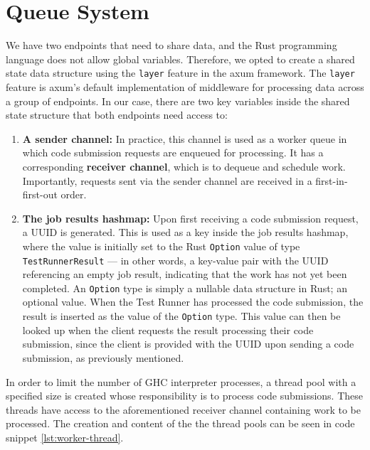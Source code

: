 \section{Queue System} \label{sec:queue-system}
We have two endpoints that need to share data, and the Rust programming language does not allow global variables.
Therefore, we opted to create a shared state data structure using the \texttt{layer} feature in the axum framework.
The \texttt{layer} feature is axum's default implementation of middleware for processing data across a group of endpoints.
In our case, there are two key variables inside the shared state structure that both endpoints need access to:
\begin{enumerate}
    \item \textbf{A sender channel:} In practice, this channel is used as a worker queue in which code submission requests are enqueued for processing. It has a corresponding \textbf{receiver channel}, which is to dequeue and schedule work. Importantly, requests sent via the sender channel are received in a first-in-first-out order.
    \item \textbf{The job results hashmap:} Upon first receiving a code submission request, a UUID is generated. This is used as a key inside the job results hashmap, where the value is initially set to the Rust \texttt{Option} value of type \texttt{TestRunnerResult} --- in other words, a key-value pair with the UUID referencing an empty job result, indicating that the work has not yet been completed. An \texttt{Option} type is simply a nullable data structure in Rust; an optional value. When the Test Runner has processed the code submission, the result is inserted as the value of the \texttt{Option} type. This value can then be looked up when the client requests the result processing their code submission, since the client is provided with the UUID upon sending a code submission, as previously mentioned.
\end{enumerate}

In order to limit the number of GHC interpreter processes, a thread pool with a specified size is created whose responsibility is to process code submissions.
These threads have access to the aforementioned receiver channel containing work to be processed.
The creation and content of the the thread pools can be seen in code snippet \ref{lst:worker-thread}.

